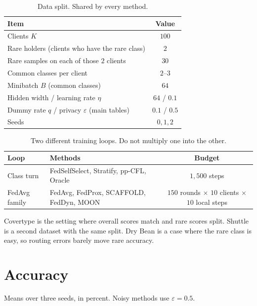 \documentclass[11pt,a4paper]{article}
\theoremstyle{plain}
\begin{document}
\begin{table}[h]
\centering
\caption{Data split. Shared by every method.}
\begin{tabular}{lc}
\toprule
Item & Value \\
\midrule
Clients $K$ & $100$ \\
Rare holders (clients who have the rare class) & $2$ \\
Rare samples on each of those $2$ clients & $30$ \\
Common classes per client & $2$--$3$ \\
Minibatch $B$ (common classes) & $64$ \\
Hidden width / learning rate $\eta$ & $64$ / $0.1$ \\
Dummy rate $q$ / privacy $\varepsilon$ (main tables) & $0.1$ / $0.5$ \\
Seeds & $0,1,2$ \\
\bottomrule
\end{tabular}
\end{table}

\begin{table}[h]
\centering
\caption{Two different training loops. Do not multiply one into the other.}
\begin{tabular}{llc}
\toprule
Loop & Methods & Budget \\
\midrule
Class turn & FedSelfSelect, Stratify, pp-CFL, Oracle & $1{,}500$ steps \\
FedAvg family & FedAvg, FedProx, SCAFFOLD, FedDyn, MOON & $150$ rounds $\times$ $10$ clients $\times$ $10$ local steps \\
\bottomrule
\end{tabular}
\end{table}

Covertype is the setting where overall scores match and rare scores split. Shuttle is a second dataset with the same split. Dry Bean is a case where the rare class is easy, so routing errors barely move rare accuracy.

\section{Accuracy}

Means over three seeds, in percent. Noisy methods use $\varepsilon=0.5$.
\end{document}
